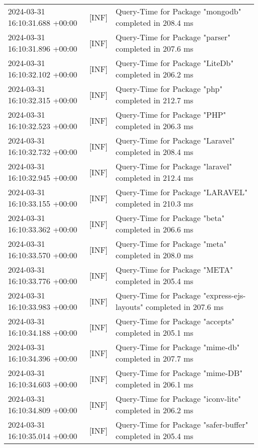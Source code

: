 {{\begin{tabularx}{\textwidth}{|l|l|X|}
                    2024-03-31 16:10:31.688 +00:00 & [INF] & Query-Time for Package "mongodb" completed in 208.4 ms \\
                    2024-03-31 16:10:31.896 +00:00 & [INF] & Query-Time for Package "parser" completed in 207.6 ms \\
                    2024-03-31 16:10:32.102 +00:00 & [INF] & Query-Time for Package "LiteDb" completed in 206.2 ms \\
                    2024-03-31 16:10:32.315 +00:00 & [INF] & Query-Time for Package "php" completed in 212.7 ms \\
                    2024-03-31 16:10:32.523 +00:00 & [INF] & Query-Time for Package "PHP" completed in 206.3 ms \\
                    2024-03-31 16:10:32.732 +00:00 & [INF] & Query-Time for Package "Laravel" completed in 208.4 ms \\
                    2024-03-31 16:10:32.945 +00:00 & [INF] & Query-Time for Package "laravel" completed in 212.4 ms \\
                    2024-03-31 16:10:33.155 +00:00 & [INF] & Query-Time for Package "LARAVEL" completed in 210.3 ms \\
                    2024-03-31 16:10:33.362 +00:00 & [INF] & Query-Time for Package "beta" completed in 206.6 ms \\
                    2024-03-31 16:10:33.570 +00:00 & [INF] & Query-Time for Package "meta" completed in 208.0 ms \\
                    2024-03-31 16:10:33.776 +00:00 & [INF] & Query-Time for Package "META" completed in 205.4 ms \\
                    2024-03-31 16:10:33.983 +00:00 & [INF] & Query-Time for Package "express-ejs-layouts" completed in 207.6 ms \\
                    2024-03-31 16:10:34.188 +00:00 & [INF] & Query-Time for Package "accepts" completed in 205.1 ms \\
                    2024-03-31 16:10:34.396 +00:00 & [INF] & Query-Time for Package "mime-db" completed in 207.7 ms \\
                    2024-03-31 16:10:34.603 +00:00 & [INF] & Query-Time for Package "mime-DB" completed in 206.1 ms \\
                    2024-03-31 16:10:34.809 +00:00 & [INF] & Query-Time for Package "iconv-lite" completed in 206.2 ms \\
                    2024-03-31 16:10:35.014 +00:00 & [INF] & Query-Time for Package "safer-buffer" completed in 205.4 ms \\

\end{tabularx}}}
